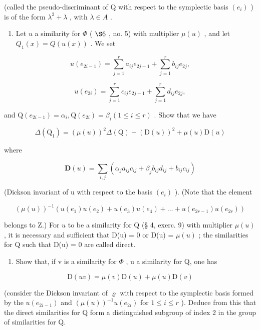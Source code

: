 (called the pseudo-discriminant of Q with respect to the symplectic basis \((e_{i})\) ) is of the form \(\lambda^{2} + \lambda\) , with \(\lambda \in A\) .

\begin{enumerate}
\def\labelenumi{\alph{enumi})}
\setcounter{enumi}{1}
\tightlist
\item
  Let \(u\) a similarity for \(\Phi\) ( \(\S 6\) , no. 5) with multiplier \(\mu(u)\) , and let \(Q_{1}(x) = Q(u(x))\) . We set
\end{enumerate}

\[
u (e _ {2 i - 1}) = \sum_ {j = 1} ^ {r} a _ {i j} e _ {2 j - 1} + \sum_ {j = 1} ^ {r} b _ {i j} e _ {2 j},
\]

\[
u (e _ {2 i}) = \sum_ {j = 1} ^ {r} c _ {i j} e _ {2 j - 1} + \sum_ {j = 1} ^ {r} d _ {i j} e _ {2 j},
\]

and \(\mathrm{Q}(e_{2i - 1}) = \alpha_i, \mathrm{Q}(e_{2i}) = \beta_i (1 \leqslant i \leqslant r)\) . Show that we have

\[
\Delta (\mathrm{Q} _ {1}) = (\mu (u)) ^ {2} \Delta (\mathrm{Q}) + (\mathrm{D} (u)) ^ {2} + \mu (u) \mathrm{D} (u)
\]

where

\[
\mathbf {D} (u) = \sum_ {i, j} (\alpha_ {j} a _ {i j} c _ {i j} + \beta_ {j} b _ {i j} d _ {i j} + b _ {i j} c _ {i j})
\]

(Dickson invariant of u with respect to the basis \((e_{i})\) ). (Note that the element

\[
(\mu (u)) ^ {- 1} (u (e _ {1}) u (e _ {2}) + u (e _ {3}) u (e _ {4}) + \dots + u (e _ {2 r - 1}) u (e _ {2 r}))
\]

belongs to Z.) For \(u\) to be a similarity for Q (§ 4, exerc. 9) with multiplier \(\mu(u)\) , it is necessary and sufficient that D(u) = 0 or D(u) = \(\mu(u)\) ; the similarities for Q such that D(u) = 0 are called direct.

\begin{enumerate}
\def\labelenumi{\alph{enumi})}
\setcounter{enumi}{2}
\tightlist
\item
  Show that, if v is a similarity for \(\Phi\) , u a similarity for Q, one has
\end{enumerate}

\[
\mathrm{D} (u v) = \mu (v) \mathrm{D} (u) + \mu (u) \mathrm{D} (v)
\]

(consider the Dickson invariant of \(\varrho\) with respect to the symplectic basis formed by the \(u(e_{2i-1})\) and \((\mu(u))^{-1}u(e_{2i})\) for \(1 \leqslant i \leqslant r\) ). Deduce from this that the direct similarities for Q form a distinguished subgroup of index 2 in the group of similarities for Q.


